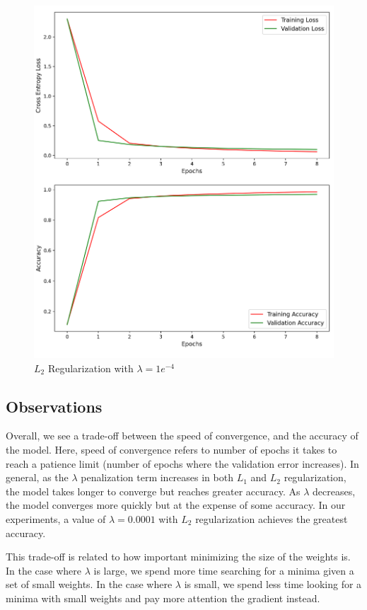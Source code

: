 \begin{figure}[!ht]
	\centering
	\includegraphics[width=1.0\textwidth]{./images/l2_e4.png}
	\caption{$L_2$ Regularization with $\lambda = 1e^{-4}$}
	\label{fig:l2_1e4}
\end{figure}

\subsection{Observations}
Overall, we see a trade-off between the speed of convergence, and the accuracy of the model. Here, speed of convergence refers to number of epochs it takes to reach a patience limit (number of epochs where the validation error increases). In general, as the $\lambda$ penalization term increases in both $L_1$ and $L_2$ regularization, the model takes longer to converge but reaches greater accuracy. As $\lambda$ decreases, the model converges more quickly but at the expense of some accuracy. In our experiments, a value of $\lambda = 0.0001$ with $L_2$ regularization achieves the greatest accuracy.

This trade-off is related to how important minimizing the size of the weights is. In the case where $\lambda$ is large, we spend more time searching for a minima given a set of small weights. In the case where $\lambda$ is small, we spend less time looking for a minima with small weights and pay more attention the gradient instead.

